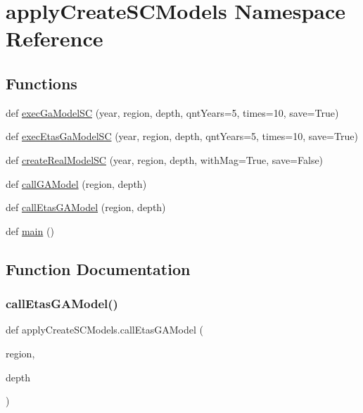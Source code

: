 \hypertarget{namespaceapply_create_s_c_models}{}\section{apply\+Create\+S\+C\+Models Namespace Reference}
\label{namespaceapply_create_s_c_models}
\subsection*{Functions}
\begin{DoxyCompactItemize}
\item 
def \hyperlink{namespaceapply_create_s_c_models_acb06a932d401dde3cc06ce800ef529fb}{exec\+Ga\+Model\+SC} (year, region, depth, qnt\+Years=5, times=10, save=True)
\item 
def \hyperlink{namespaceapply_create_s_c_models_abf6dafc972591d94c597acc2fcb90dd4}{exec\+Etas\+Ga\+Model\+SC} (year, region, depth, qnt\+Years=5, times=10, save=True)
\item 
def \hyperlink{namespaceapply_create_s_c_models_ab9bac5d8263793efc4b8db3b957a2087}{create\+Real\+Model\+SC} (year, region, depth, with\+Mag=True, save=False)
\item 
def \hyperlink{namespaceapply_create_s_c_models_ababbf819f509b367f2bb9cda41e8d856}{call\+G\+A\+Model} (region, depth)
\item 
def \hyperlink{namespaceapply_create_s_c_models_a602e755939a08f4bab291ed55646d356}{call\+Etas\+G\+A\+Model} (region, depth)
\item 
def \hyperlink{namespaceapply_create_s_c_models_a320e2283a254f21845fa4b6af7a65e68}{main} ()
\end{DoxyCompactItemize}


\subsection{Function Documentation}
\mbox{\label{namespaceapply_create_s_c_models_a602e755939a08f4bab291ed55646d356}} 
\subsubsection{\texorpdfstring{call\+Etas\+G\+A\+Model()}{callEtasGAModel()}}
{\footnotesize\ttfamily def apply\+Create\+S\+C\+Models.\+call\+Etas\+G\+A\+Model (\begin{DoxyParamCaption}\item[{}]{region,  }\item[{}]{depth }\end{DoxyParamCaption})}

